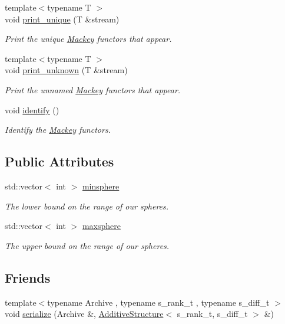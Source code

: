\begin{DoxyCompactItemize}
{\footnotesize template$<$typename T $>$ }\\void \hyperlink{classMackey_1_1AdditiveStructure_a82ea44d284efe410fb5d43c6a41dd3ed}{print\+\_\+unique} (T \&stream)
\begin{DoxyCompactList}\small\item\em Print the unique \hyperlink{namespaceMackey}{Mackey} functors that appear. \end{DoxyCompactList}\item 
{\footnotesize template$<$typename T $>$ }\\void \hyperlink{classMackey_1_1AdditiveStructure_a6c68d66e89c3ad3a81dde8fd35837c3c}{print\+\_\+unknown} (T \&stream)
\begin{DoxyCompactList}\small\item\em Print the unnamed \hyperlink{namespaceMackey}{Mackey} functors that appear. \end{DoxyCompactList}\item 
void \hyperlink{classMackey_1_1AdditiveStructure_a07887e78e182c1215fc7c8af3f385529}{identify} ()
\begin{DoxyCompactList}\small\item\em Identify the \hyperlink{namespaceMackey}{Mackey} functors. \end{DoxyCompactList}\end{DoxyCompactItemize}
\subsection*{Public Attributes}
\begin{DoxyCompactItemize}
\item 
std\+::vector$<$ int $>$ \hyperlink{classMackey_1_1AdditiveStructure_a1158af906d8bb5b9dcc7eed72367f25e}{minsphere}
\begin{DoxyCompactList}\small\item\em The lower bound on the range of our spheres. \end{DoxyCompactList}\item 
std\+::vector$<$ int $>$ \hyperlink{classMackey_1_1AdditiveStructure_a1d26ee2b19d9d66744ee4d79c302d9c4}{maxsphere}
\begin{DoxyCompactList}\small\item\em The upper bound on the range of our spheres. \end{DoxyCompactList}\end{DoxyCompactItemize}
\subsection*{Friends}
\begin{DoxyCompactItemize}
\item 
{\footnotesize template$<$typename Archive , typename s\+\_\+rank\+\_\+t , typename s\+\_\+diff\+\_\+t $>$ }\\void \hyperlink{classMackey_1_1AdditiveStructure_ac693381dd6714e55f0307b9cea4a87cf}{serialize} (Archive \&, \hyperlink{classMackey_1_1AdditiveStructure}{Additive\+Structure}$<$ s\+\_\+rank\+\_\+t, s\+\_\+diff\+\_\+t $>$ \&)
\end{DoxyCompactItemize}


